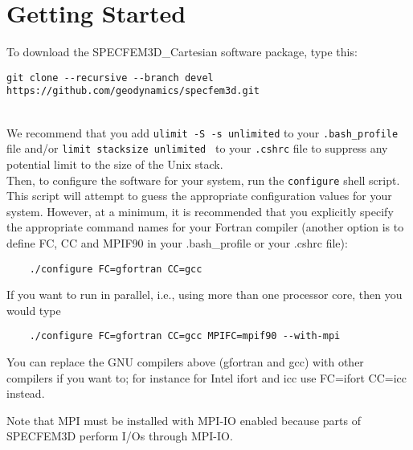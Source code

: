 \chapter{Getting Started}\label{cha:Getting-Started}

To download the SPECFEM3D\_Cartesian software package, type this:
\begin{verbatim}
git clone --recursive --branch devel https://github.com/geodynamics/specfem3d.git
\end{verbatim}
%
\noindent
{}\\

\noindent
We recommend that you add {\texttt{ulimit -S -s unlimited}} to your
{\texttt{.bash\_profile}} file and/or {\texttt{limit stacksize
unlimited }} to your {\texttt{.cshrc}} file to suppress any potential
limit to the size of the Unix stack.\\

Then, to configure the software for your system, run the
\texttt{configure} shell script. This script will attempt to guess
the appropriate configuration values for your system. However, at
a minimum, it is recommended that you explicitly specify the appropriate
command names for your Fortran compiler (another option is to define FC, CC and MPIF90 in your .bash\_profile
or your .cshrc file):
%
\begin{verbatim}
    ./configure FC=gfortran CC=gcc
\end{verbatim}
%
If you want to run in parallel, i.e., using more than one processor core, then you would type
%
\begin{verbatim}
    ./configure FC=gfortran CC=gcc MPIFC=mpif90 --with-mpi
\end{verbatim}

You can replace the GNU compilers above (gfortran and gcc) with other compilers if you want to; for instance for Intel ifort and icc use FC=ifort CC=icc instead.

Note that MPI must be installed with MPI-IO enabled because parts of SPECFEM3D perform I/Os through MPI-IO.

